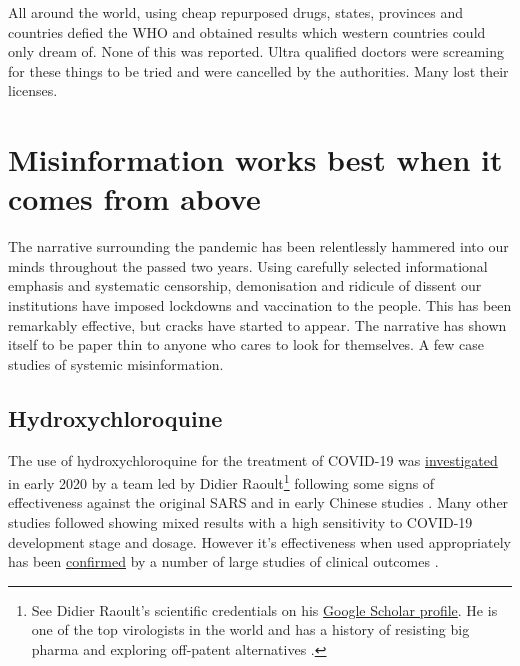 \documentclass[11pt,a4paper,notitlepage]{report}
\begin{document}
All around the world, using cheap repurposed drugs, states, provinces and countries defied the WHO and obtained results which western countries could only dream of. None of this was reported. Ultra qualified doctors were screaming for these things to be tried and were cancelled by the authorities. Many lost their licenses. 

\section*{Misinformation works best when it comes from above}

The narrative surrounding the pandemic has been relentlessly hammered into our minds throughout the passed two years. Using carefully selected informational emphasis and systematic censorship, demonisation and ridicule of dissent our institutions have imposed lockdowns and vaccination to the people. This has been remarkably effective, but cracks have started to appear. The narrative has shown itself to be paper thin to anyone who cares to look for themselves. A few case studies of systemic misinformation.

\subsection*{Hydroxychloroquine}

The use of hydroxychloroquine for the treatment of COVID-19 was \href{https://pubmed.ncbi.nlm.nih.gov/32205204/}{investigated} in early 2020 by a team led by Didier Raoult\footnote{See Didier Raoult's scientific credentials on his \href{https://scholar.google.fr/citations?user=n8EF_6kAAAAJ&hl=fr}{Google Scholar profile}. He is one of the top virologists in the world and has a history of resisting big pharma and exploring off-patent alternatives \cite{doi:10.1177/1440783320936740}.} following some signs of effectiveness against the original SARS and in early Chinese studies \cite{Lagier2020-dw}. Many other studies followed showing mixed results with a high sensitivity to COVID-19 development stage and dosage. However it's effectiveness when used appropriately has been \href{https://www.ncbi.nlm.nih.gov/pmc/articles/PMC8023208/}{confirmed} by a number of large studies of clinical outcomes \cite{Mokhtari2021-ot}. 

\end{document}
